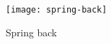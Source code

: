 \begin{figure}[H]
    \centering
    \texttt{[image: spring-back]}
    \caption{Spring back \cite[p. ]{cruz_applicationmachinelearning_2021}}
    \label{fig:spring-back}
\end{figure}






